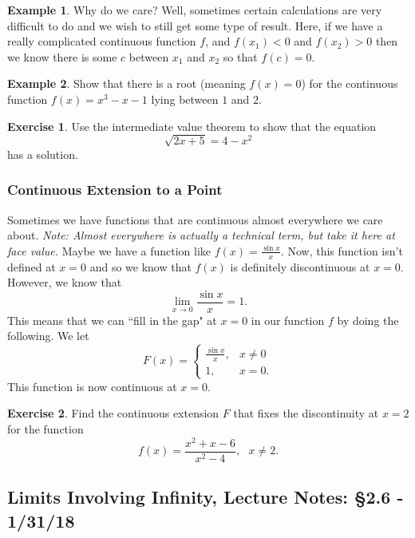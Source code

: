 \documentclass[leqno]{article}
\theoremstyle{definition}
\newtheorem{example}{Example}[section]
\newtheorem{exercise}{Exercise}[section]
\theoremstyle{remark}
\theoremstyle{theorem}
\begin{document}
\begin{example}
Why do we care? Well, sometimes certain calculations are very difficult to do and we wish to still get some type of result.  Here, if we have a really complicated continuous function $f$, and $f(x_1)<0$ and $f(x_2)>0$ then we know there is some $c$ between $x_1$ and $x_2$ so that $f(c)=0$.  
\end{example}

\begin{example}
Show that there is a root (meaning $f(x)=0$) for the continuous function $f(x)=x^3-x-1$ lying between $1$ and $2$.  
\vspace*{5cm}
\end{example}

\begin{exercise}
Use the intermediate value theorem to show that the equation
\[
\sqrt{2x+5}=4-x^2
\]
has a solution.
\vspace*{5cm}
\end{exercise}

\subsubsection{Continuous Extension to a Point}

Sometimes we have functions that are continuous almost everywhere we care about.  \emph{Note: Almost everywhere is actually a technical term, but take it here at face value.}  Maybe we have a function like $f(x)=\frac{\sin x}{x}$.  Now, this function isn't defined at $x=0$ and so we know that $f(x)$ is definitely discontinuous at $x=0$.  However, we know that 
\[
\lim_{x\to 0} \frac{\sin x}{x}=1.
\]
This means that we can ``fill in the gap" at $x=0$ in our function $f$ by doing the following.  We let
\[
F(x)=
\begin{cases}
\frac{\sin x}{x}, & x\neq 0\\
1,& x=0.
\end{cases}
\]
This function is now continuous at $x=0$. 

\begin{exercise}
Find the continuous extension $F$ that fixes the discontinuity at $x=2$ for the function 
\[
f(x)=\frac{x^2+x-6}{x^2-4}, ~~~ x\neq 2.
\]
\vspace*{5cm}
\end{exercise}

\subsection{Limits Involving Infinity, Lecture Notes: \S 2.6 - 1/31/18}
\end{document}
